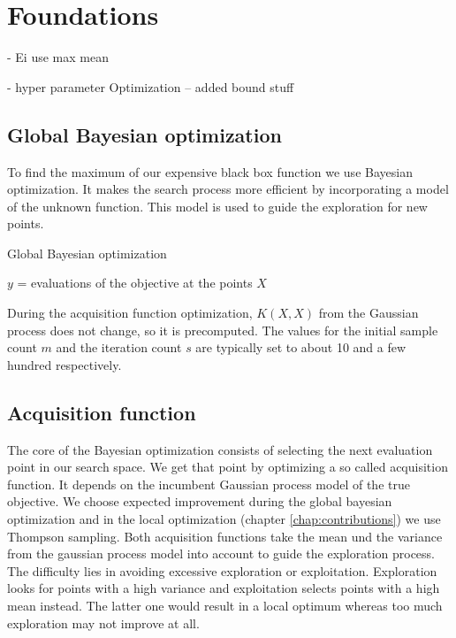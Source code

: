 \chapter{Foundations}
\label{chap:2}

- Ei use max mean

- hyper parameter Optimization
-- added bound stuff

\section{Global Bayesian optimization}

To find the maximum of our expensive black box function we use Bayesian optimization. It makes the search process more efficient by incorporating a model of the unknown function. This model is used to guide the exploration for new points.

\begin{algorithm}
    \caption{Global Bayesian optimization\label{alg:boGlob}}
    \BlankLine

    $y$ = evaluations of the objective at the points $X$\\
\end{algorithm}

During the acquisition function optimization, $K(X,X)$ from the Gaussian process does not change, so it is precomputed. The values for the initial sample count $m$ and the iteration count $s$ are typically set to about 10 and a few hundred respectively.

\section{Acquisition function}
The core of the Bayesian optimization consists of selecting the next evaluation point in our search space. We get that point by optimizing a so called acquisition function. It depends on the incumbent Gaussian process model of the true objective. We choose expected improvement during the global bayesian optimization and in the local optimization (chapter \ref{chap:contributions}) we use Thompson sampling. Both acquisition functions take the mean und the variance from the gaussian process model into account to guide the exploration process. The difficulty lies in avoiding excessive exploration or exploitation. Exploration looks for points with a high variance and exploitation selects points with a high mean instead. The latter one would result in a local optimum whereas too much exploration may not improve at all.

